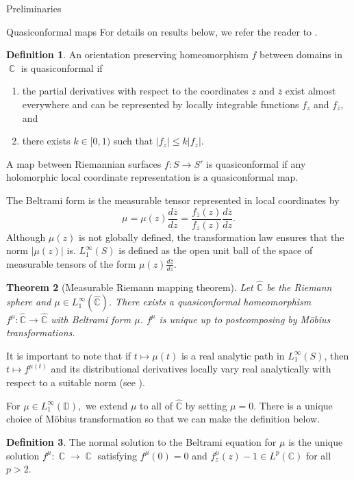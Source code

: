 \documentclass[10pt]{amsart}
\newtheorem{thm}{Theorem}[section]
\DeclareMathOperator{\C}{\mathbb{C}}
\theoremstyle{definition}
\newtheorem{defn}[thm]{Definition}
\begin{document}
\begin{section}{Preliminaries}
\begin{subsection}{Quasiconformal maps}\label{subqc} For details on results below, we refer the reader to \cite{Ah}.
\begin{defn}
An orientation preserving homeomorphism $f$ between domains in $\C$ is quasiconformal if 
\begin{enumerate}
    \item the partial derivatives with respect to the coordinates $z$ and $\overline{z}$ exist almost everywhere and can be represented by locally integrable functions $f_z$ and $f_{\overline{z}},$ and
    \item there exists $k\in [0,1)$ such that $|f_{\overline{z}}|\leq k |f_z|.$
\end{enumerate}
A map between Riemannian surfaces $f:S\to S'$ is quasiconformal if any holomorphic local coordinate representation is a quasiconformal map. 
\end{defn}
The Beltrami form is the measurable tensor represented in local coordinates by $$\mu=\mu(z)\frac{d\overline{z}}{dz}=\frac{f_{\overline{z}}(z)}{f_z(z)}\frac{d\overline{z}}{dz}.$$ Although $\mu(z)$ is not globally defined, the transformation law ensures that the norm $|\mu(z)|$ is. $L_1^\infty(S)$ is defined as the open unit ball of the space of measurable tensors of the form $\mu(z)\frac{d\overline{z}}{dz}$.
\begin{thm}[Measurable Riemann mapping theorem]\label{RMT}
Let $\hat{\mathbb{C}}$ be the Riemann sphere and $\mu\in L_1^\infty(\hat{\mathbb{C}})$. There exists a quasiconformal homeomorphism $f^\mu:\hat{\mathbb{C}}\to\hat{\mathbb{C}}$ with Beltrami form $\mu$. $f^\mu$ is unique up to postcomposing by M{\"o}bius transformations. 
\end{thm}
It is important to note that if $t\mapsto \mu(t)$ is a real analytic path in $L_1^\infty(S)$, then $t\mapsto f^{\mu(t)}$ and its distributional derivatives locally vary real analytically with respect to a suitable norm (see \cite[Chapter V]{Ah}).

For $\mu\in L_1^\infty(\mathbb{D}),$ we extend $\mu$ to all of $\hat{\mathbb{C}}$ by setting $\mu=0$. There is a unique choice of M{\"o}bius transformation so that we can make the definition below.
\begin{defn}
The normal solution to the Beltrami equation for $\mu$ is the unique solution $f^\mu:\C\to\C$ satisfying $f^\mu(0)=0$ and $f_z^\mu(z) -1\in L^p(\mathbb{C})$ for all $p>2$.
\end{defn}


\end{subsection}
\end{section}
\end{document}
